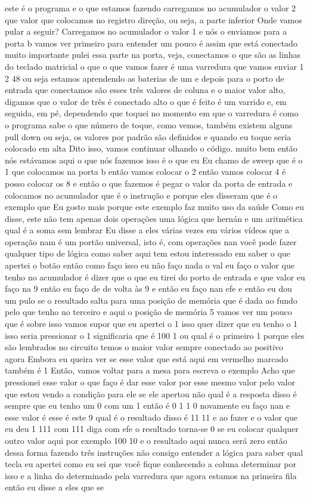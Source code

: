 \documentclass[oneside,11pt]{memoir} %
\begin{document}
este é o programa  e o que estamos fazendo  carregamos no acumulador o valor 2 que  valor que colocamos no registro  direção, ou seja, a parte inferior  Onde vamos pular a seguir?  Carregamos no acumulador o valor 1 e  nós o enviamos para a porta b  vamos ver primeiro para entender um pouco  é assim que está conectado  muito importante pulei essa parte  na porta, veja, conectamos o que  são as linhas do teclado matricial o que  o que vamos fazer é uma varredura que vamos  enviar 1 2  48 ou seja estamos aprendendo as baterias  de um e depois para o porto de entrada  que conectamos são esses três  valores de coluna e o maior valor  alto, digamos que o valor de três é  conectado alto o que é feito é um  varrido e, em seguida, em pé, dependendo  que toquei no momento em que o  varredura é como o programa sabe o que  número de toque, como vemos, também existem alguns  pull down ou seja, os valores por  padrão são definidos e quando eu  toque seria colocado em alta  Dito isso, vamos continuar olhando o código.  muito bem então nós estávamos aqui o que  nós fazemos isso é o que eu  Eu chamo de sweep que é o 1 que colocamos  na porta b então vamos colocar o  2 então vamos colocar 4 é posso colocar  os 8  e então o que fazemos é pegar o  valor da porta de entrada e  colocamos no acumulador que é o  instrução  e porque eles disseram que é o exemplo que  Eu gosto mais porque este exemplo  faz muito uso da saúde  Como eu disse, este não tem apenas dois  operações uma lógica que hernán e um  aritmética qual é a soma sem lembrar  Eu disse a eles várias vezes em vários vídeos  que a operação nam é um portão  universal, isto é, com operações  nan você pode fazer qualquer tipo de  lógica  como saber aqui tem estou interessado em saber o que  apertei o botão então como faço  isso eu não faço nada o val eu faço o valor  que tenho no acumulador é dizer que  o que eu tirei do porto de entrada e que  valor eu faço na 9 então eu faço de  de volta às 9 e então eu faço nan  efe  e então eu dou um pulo se o  resultado salta para uma posição de  memória que é dada ao fundo  pelo que tenho no terceiro e aqui o  posição de memória 5 vamos ver um  pouco que é sobre isso vamos supor  que eu apertei o 1  isso quer dizer que eu tenho o 1 isso seria  pressionar o 1 significaria que é 100 1 ou  qual é o primeiro 1 porque eles são lembrados  no circuito temos o maior valor  sempre conectado ao positivo agora  Embora eu queira ver se esse valor que  está aqui em vermelho marcado também é 1  Então, vamos voltar para a mesa para  escreva o exemplo  Acho que pressionei esse valor o que  faço é dar esse valor por esse mesmo  valor pelo valor que estou vendo  a condição para ele se ele apertou não  qual é a resposta disso é sempre  que eu tenho um 0 com um 1 então é 0 1  1 0  novamente eu faço nan e esse valor é esse  é este 9 qual é o resultado disso é  11 11 e ao fazer e o valor que eu  deu 1 111 com 111 diga com efe o  resultado torna-se 0 se eu colocar  qualquer outro valor aqui por exemplo 100  10 e o resultado aqui nunca será  zero então dessa forma fazendo três  instruções não consigo entender a lógica  para saber qual tecla eu apertei como eu sei  que você fique conhecendo a coluna  determinar por isso e a linha do  determinado pela varredura que agora  estamos na primeira fila  então eu disse a eles que se 
\end{document}
